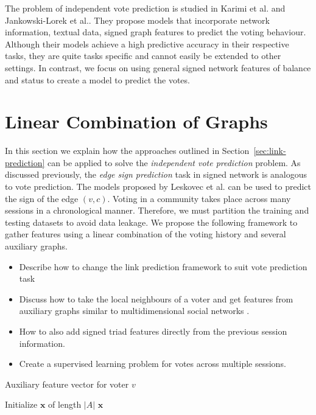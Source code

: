 The problem of independent vote prediction is studied in Karimi et al. \cite{karimi2019multicongress} and Jankowski-Lorek et al.\cite{jankowski-lorek2013MBSN}. They propose models that incorporate network information, textual data, signed graph features to predict the voting behaviour. Although their models achieve a high predictive accuracy in their respective tasks, they are quite tasks specific and cannot easily be extended to other settings. In contrast, we focus on using general signed network features of balance and status to create a model to predict the votes. 

\fi

\section{Linear Combination of Graphs}
\label{sec:linear-combination-theory}

In this section we explain how the approaches outlined in Section~\ref{sec:link-prediction} can be applied to solve the \textit{independent vote prediction} problem. As discussed previously, the \textit{edge sign prediction} task in signed network is analogous to vote prediction. The models proposed by Leskovec et al. \cite{leskovec2010predicting} can be used to predict the sign of the edge $(v,c)$. Voting in a community takes place across many sessions in a chronological manner. Therefore, we must partition the training and testing datasets to avoid data leakage. We propose the following framework to gather features using a linear combination of the voting history and several auxiliary graphs.




\begin{itemize}
    \item Describe how to change the link prediction framework to suit vote prediction task
    \item Discuss how to take the local neighbours of a voter and get features from auxiliary graphs similar to multidimensional social networks \cite{kazienko2011multidimensional}. 
    \item How to also add signed triad features directly from the previous session information.
    \item Create a supervised learning problem for votes across multiple sessions. 
\end{itemize}

\begin{algorithm}[H]
    \DontPrintSemicolon
    \caption{Auxiliary feature vector for voter $v$ }
    Initialize $\mathbf{x}$ of length $|A|$
    \Return $\mathbf{x}$
\end{algorithm}

